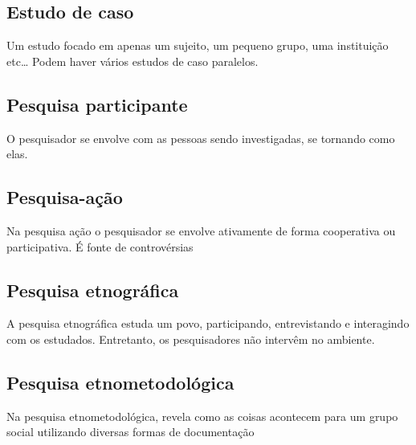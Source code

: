 \subsection{Estudo de caso}
Um estudo focado em apenas um sujeito, um pequeno grupo, uma instituição etc… Podem haver vários estudos de caso paralelos.

\subsection{Pesquisa participante}
O pesquisador se envolve com as pessoas sendo investigadas, se tornando como elas.

\subsection{Pesquisa-ação}
Na pesquisa ação o pesquisador se envolve ativamente de forma cooperativa ou participativa. É fonte de controvérsias

\subsection{Pesquisa etnográfica}
A pesquisa etnográfica estuda um povo, participando, entrevistando e interagindo com os estudados. Entretanto, os pesquisadores não intervêm no ambiente.

\subsection{Pesquisa etnometodológica}
Na pesquisa etnometodológica, revela como as coisas acontecem para um grupo social utilizando diversas formas de documentação
